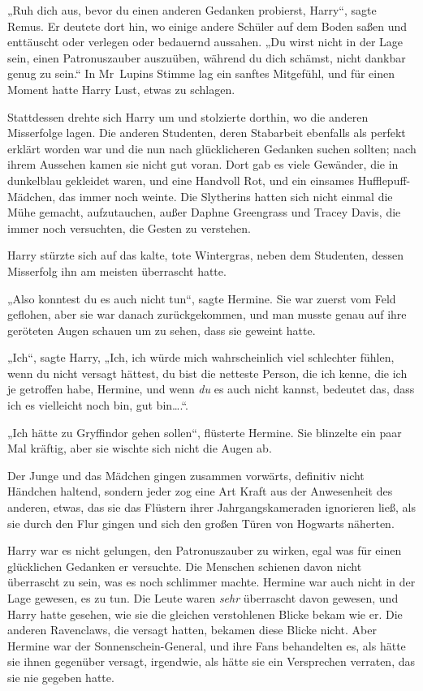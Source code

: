 {„Ruh dich aus, bevor du einen anderen Gedanken probierst, Harry“, sagte Remus. Er deutete dort hin, wo einige andere Schüler auf dem Boden saßen und enttäuscht oder verlegen oder bedauernd aussahen. „Du wirst nicht in der Lage sein, einen Patronuszauber auszuüben, während du dich schämst, nicht dankbar genug zu sein.“ In Mr~Lupins Stimme lag ein sanftes Mitgefühl, und für einen Moment hatte Harry Lust, etwas zu schlagen.

Stattdessen drehte sich Harry um und stolzierte dorthin, wo die anderen Misserfolge lagen. Die anderen Studenten, deren Stabarbeit ebenfalls als perfekt erklärt worden war und die nun nach glücklicheren Gedanken suchen sollten; nach ihrem Aussehen kamen sie nicht gut voran. Dort gab es viele Gewänder, die in dunkelblau gekleidet waren, und eine Handvoll Rot, und ein einsames Hufflepuff-Mädchen, das immer noch weinte. Die Slytherins hatten sich nicht einmal die Mühe gemacht, aufzutauchen, außer Daphne Greengrass und Tracey Davis, die immer noch versuchten, die Gesten zu verstehen.

Harry stürzte sich auf das kalte, tote Wintergras, neben dem Studenten, dessen Misserfolg ihn am meisten überrascht hatte.

„Also konntest du es auch nicht tun“, sagte Hermine. Sie war zuerst vom Feld geflohen, aber sie war danach zurückgekommen, und man musste genau auf ihre geröteten Augen schauen um zu sehen, dass sie geweint hatte.

„Ich“, sagte Harry, „Ich, ich würde mich wahrscheinlich viel schlechter fühlen, wenn du nicht versagt hättest, du bist die netteste Person, die ich kenne, die ich je getroffen habe, Hermine, und wenn \emph{du} es auch nicht kannst, bedeutet das, dass ich es vielleicht noch bin, gut bin….“.

„Ich hätte zu Gryffindor gehen sollen“, flüsterte Hermine. Sie blinzelte ein paar Mal kräftig, aber sie wischte sich nicht die Augen ab.

Der Junge und das Mädchen gingen zusammen vorwärts, definitiv nicht Händchen haltend, sondern jeder zog eine Art Kraft aus der Anwesenheit des anderen, etwas, das sie das Flüstern ihrer Jahrgangskameraden ignorieren ließ, als sie durch den Flur gingen und sich den großen Türen von Hogwarts näherten.

Harry war es nicht gelungen, den Patronuszauber zu wirken, egal was für einen glücklichen Gedanken er versuchte. Die Menschen schienen davon nicht überrascht zu sein, was es noch schlimmer machte. Hermine war auch nicht in der Lage gewesen, es zu tun. Die Leute waren \emph{sehr} überrascht davon gewesen, und Harry hatte gesehen, wie sie die gleichen verstohlenen Blicke bekam wie er. Die anderen Ravenclaws, die versagt hatten, bekamen diese Blicke nicht. Aber Hermine war der Sonnenschein-General, und ihre Fans behandelten es, als hätte sie ihnen gegenüber versagt, irgendwie, als hätte sie ein Versprechen verraten, das sie nie gegeben hatte.

}
